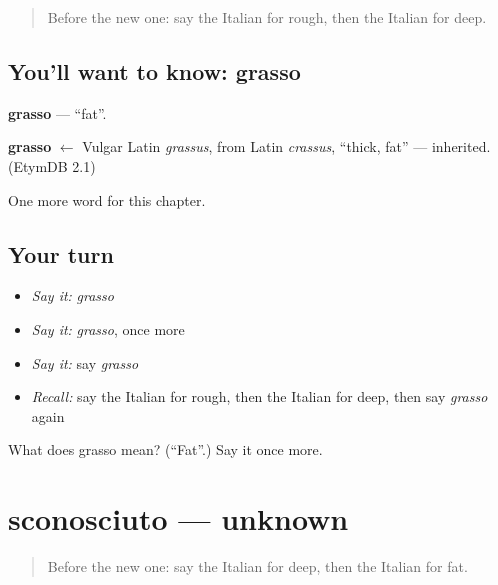 \label{lesson:IT-C245-grasso}



\begin{quote}
Before the new one: say the Italian for rough, then the Italian for deep.
\end{quote}

\subsection*{You'll want to know: grasso}
\textbf{grasso} — \textquotedblleft{}fat\textquotedblright{}.

\begin{cousinweb}
\textbf{grasso} $\leftarrow$ Vulgar Latin \emph{grassus}, from Latin \emph{crassus}, \textquotedblleft{}thick, fat\textquotedblright{} — inherited. (EtymDB 2.1)
\end{cousinweb}

\begin{grammarlens}[title={What you've built}]
One more word for this chapter.
\end{grammarlens}

\subsection*{Your turn}
\begin{itemize}
\raggedright
  \item \emph{Say it:} \emph{grasso}
  \item \emph{Say it:} \emph{grasso}, once more
  \item \emph{Say it:} say \emph{grasso}
  \item \emph{Recall:} say the Italian for rough, then the Italian for deep, then say \emph{grasso} again
\end{itemize}

\begin{tcolorbox}[breakable,colback=teal!4,colframe=teal!35!black,title={Before you move on}]
What does grasso mean? (\textquotedblleft{}Fat\textquotedblright{}.) Say it once more.
\end{tcolorbox}
\section[sconosciuto]{sconosciuto — unknown}

\label{lesson:IT-C245-sconosciuto}



\begin{quote}
Before the new one: say the Italian for deep, then the Italian for fat.
\end{quote}

